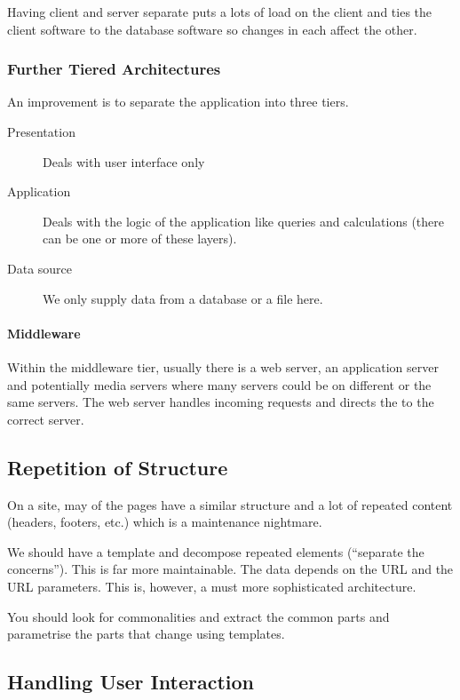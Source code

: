 Having client and server separate puts a lots of load on the client  and ties the client software to the database software so changes in each affect the other.

\subsubsection{Further Tiered Architectures}\label{ssub:further_tiered_architecures}

An improvement is to separate the application into three tiers.
\begin{description}
	\item[Presentation] Deals with user interface only
	\item[Application] Deals with the logic of the application like queries and calculations (there can be one or more of these layers).
	\item[Data source] We only supply data from a database or a file here.
\end{description}

\paragraph{Middleware}\label{par:middleware}

Within the middleware tier, usually there is a web server, an application server and potentially media servers where many servers could be on different or the same servers.
The web server handles incoming requests and directs the to the correct server.

\subsection{Repetition of Structure}\label{sub:repetition_of_structure}

On a site, may of the pages have a similar structure and a lot of repeated content (headers, footers, etc.) which is a maintenance nightmare.

We should have a template and decompose repeated elements (``separate the concerns'').
This is far more maintainable.
The data depends on the URL and the URL parameters.
This is, however, a must more sophisticated architecture.

You should look for commonalities and extract the common parts and parametrise the parts that change using templates.

\subsection{Handling User Interaction}\label{sub:handling_user_interaction}

